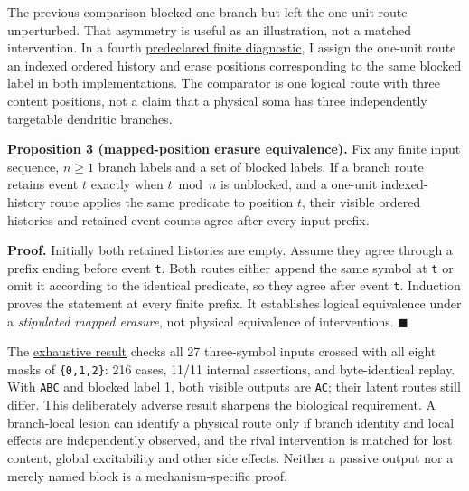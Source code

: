 \documentclass[
  american,
  11pt,
  letterpaper,
]{article}
\begin{document}
The previous comparison blocked one branch but left the one-unit route unperturbed. That asymmetry is useful as an illustration, not a matched intervention. In a fourth \href{https://github.com/v5ma/v5ma.github.io/blob/f6d3867df89ae9dea32f763b1d55c84212c41cc6/papers/companions/five-papers-20260923/temporal/paper/applications/mapped-intervention-v04/PROTOCOL.md}{predeclared finite diagnostic}, I assign the one-unit route an indexed ordered history and erase positions corresponding to the same blocked label in both implementations. The comparator is one logical route with three content positions, not a claim that a physical soma has three independently targetable dendritic branches.

\textbf{Proposition 3 (mapped-position erasure equivalence).} Fix any finite input sequence, \(n\geq1\) branch labels and a set of blocked labels. If a branch route retains event \(t\) exactly when \(t\bmod n\) is unblocked, and a one-unit indexed-history route applies the same predicate to position \(t\), their visible ordered histories and retained-event counts agree after every input prefix.

\textbf{Proof.} Initially both retained histories are empty. Assume they agree through a prefix ending before event \texttt{t}. Both routes either append the same symbol at \texttt{t} or omit it according to the identical predicate, so they agree after event \texttt{t}. Induction proves the statement at every finite prefix. It establishes logical equivalence under a \emph{stipulated mapped erasure}, not physical equivalence of interventions. \(\blacksquare\)

The \href{https://github.com/v5ma/v5ma.github.io/blob/f6d3867df89ae9dea32f763b1d55c84212c41cc6/papers/companions/five-papers-20260923/temporal/paper/applications/mapped-intervention-v04/README.md}{exhaustive result} checks all 27 three-symbol inputs crossed with all eight masks of \texttt{\{0,1,2\}}: 216 cases, 11/11 internal assertions, and byte-identical replay. With \texttt{ABC} and blocked label 1, both visible outputs are \texttt{AC}; their latent routes still differ. This deliberately adverse result sharpens the biological requirement. A branch-local lesion can identify a physical route only if branch identity and local effects are independently observed, and the rival intervention is matched for lost content, global excitability and other side effects. Neither a passive output nor a merely named block is a mechanism-specific proof.
\end{document}
